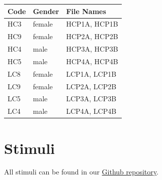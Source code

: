 \documentclass[
  a4paper,
]{scrreprt}
\begin{document}
\begin{longtable}[]{@{}lll@{}}
\toprule\noalign{}
Code & Gender & File Names \\
\midrule\noalign{}
\endhead
\bottomrule\noalign{}
\endlastfoot
HC3 & female & HCP1A, HCP1B \\
HC9 & female & HCP2A, HCP2B \\
HC4 & male & HCP3A, HCP3B \\
HC5 & male & HCP4A, HCP4B \\
LC8 & female & LCP1A, LCP1B \\
LC9 & female & LCP2A, LCP2B \\
LC5 & male & LCP3A, LCP3B \\
LC4 & male & LCP4A, LCP4B \\
\end{longtable}

\hypertarget{sec-sound-stimuli}{%
\section{Stimuli}\label{sec-sound-stimuli}}

All stimuli can be found in our
\href{https://github.com/Howquez/vocalized-preferences/tree/main/software/pilots/preferences/static/models}{Github
repository}.
\end{document}
